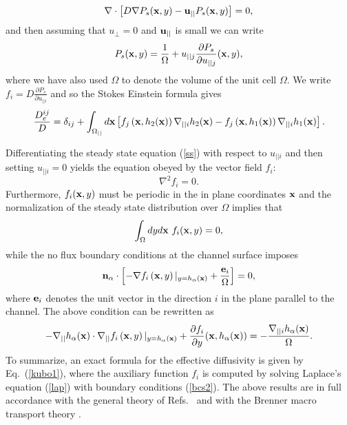 \documentclass[pre,showpacs,preprintnumbers,amsmath,amssymb,superscriptaddress]{revtex4-1}
\begin{document}
{\begin{equation}
\nabla\cdot \left[ D \nabla P_s({\bf x},y)- {\bf u}_{||} P_s({\bf x},y)\right]=0, \label{ss}
\end{equation}
and then assuming that $u_\perp=0$ and ${\bf u}_{||}$ is small we can write
\begin{equation}
P_s({\bf x},y) = \frac{1}{\Omega} + u_{||j}\frac{\partial P_s}{\partial u_{||j}}({\bf x},y),
\end{equation}
where we have also used $\Omega$ to denote the volume of the unit cell $\Omega$.
We write $f_i = D\frac{\partial P_s}{\partial u_{||i}}$ and so the Stokes Einstein formula gives
\begin{equation}
\frac{D_{e}^{ij}}{D} = \delta_{ij} +  \int_{\Omega_{||}} d{\bf x} \left[ f_j\left({\bf x},h_2({\bf x})\right) \nabla_{||i}h_2({\bf x}) -
f_j\left({\bf x},h_1({\bf x})\right) \nabla_{||i}h_1({\bf x}) \right].\label{kubo1}
\end{equation}

Differentiating the steady state equation (\ref{ss}) with respect to $u_{||i}$ and then setting $u_{||i}=0$ yields the equation obeyed by the vector field $f_i$:
\begin{equation}
\nabla^2 f_i =0. \label{lap}
\end{equation}
Furthermore, $ f_i({\bf x},y)$ must be periodic in the in plane coordinates ${\bf x}$ and the normalization of the steady state distribution over $\Omega$ implies that
\begin{equation}
\int_\Omega dyd{\bf x}\ f_i({\bf x},y) = 0,\label{int}
\end{equation}
while the no flux boundary conditions at the channel surface imposes 
\begin{equation}
{\bf n_\alpha}\cdot\left[-\nabla f_i\left({\bf x}, y\right)|_{y=h_\alpha({\bf x})} +\frac{{\bf e}_i}{\Omega}\right]=0,\label{bcs}
\end{equation}
where ${\bf e}_i$ denotes the unit vector in the direction $i$ in the plane parallel to the channel. The above condition can be rewritten
as 
\begin{equation}
-\nabla_{||}h_\alpha ({\bf x})\cdot\nabla_{||}f_i\left({\bf x}, y\right)|_{y=h_\alpha({\bf x})} + \frac{\partial f_i}{\partial y}({\bf x},h_\alpha({\bf x}))= -\frac{\nabla_{||i}h_\alpha({\bf x})}{\Omega}.\label{bcs2}
\end{equation}
To summarize, an exact formula for the effective diffusivity is given by Eq.~(\ref{kubo1}), where the auxiliary function $f_i$ is computed by solving Laplace's equation (\ref{lap}) with boundary conditions (\ref{bcs2}). The above results are in full accordance with the general theory of Refs.~\cite{gue2015a,gue2015b} and with the Brenner macro transport theory \cite{bre1993}. 


}
\end{document}
